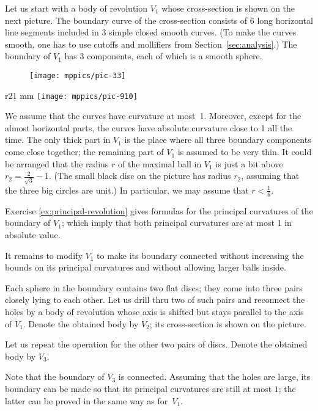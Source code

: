 Let us start with a body of revolution $V_1$ whose cross-section is shown on the next picture.
The boundary curve of the cross-section consists of 6 long horizontal line segments included in 3 simple closed smooth curves.
(To make the curves smooth, one has to use cutoffs and mollifiers from Section~\ref{sec:analysis}.)
The boundary of $V_1$ has 3 components, each of which is a smooth sphere.

\begin{figure}[ht!]
\centering
\texttt{[image: mppics/pic-33]}
\vskip0mm
\end{figure}

{

\begin{wrapfigure}{r}{21 mm}
\vskip-4mm
\centering
\texttt{[image: mppics/pic-910]}
\vskip0mm
\end{wrapfigure}

We assume that the curves have curvature at most~1.
Moreover, except for the almost horizontal parts, the curves have absolute curvature close to 1 all the time.
The only thick part in $V_1$ is the place where all three boundary components come close together;
the remaining part of $V_1$ is assumed to be very thin.
It could be arranged that the radius $r$ of the maximal ball in $V_1$ is just a bit above 
$r_2=\tfrac2{\sqrt{3}}-1$.
(The small black disc on the picture has radius $r_2$,
assuming that the three big circles are unit.)
In particular, we may assume that $r<\tfrac16$.

}

Exercise \ref{ex:principal-revolution} gives formulas for the principal curvatures of the boundary of $V_1$;
which imply that both principal curvatures are at most 1 in absolute value. 

It remains to modify $V_1$ to make its boundary connected without increasing the bounds on its principal curvatures and without allowing larger balls inside.

Each sphere in the boundary contains two flat discs;
they come into three pairs closely lying to each other. 
Let us drill thru two of such pairs and reconnect the holes by a body of revolution whose 
axis is shifted but stays parallel to the axis of $V_1$.
Denote the obtained body by $V_2$; its cross-section is shown on the picture. 

Let us repeat the operation for the other two pairs of discs.
Denote the obtained body by $V_3$.

Note that the boundary of $V_3$ is connected.
Assuming that the holes are large, its boundary can be made so that its principal curvatures are still at most $1$; the latter can be proved in the same way as for~$V_1$.
\qeds


